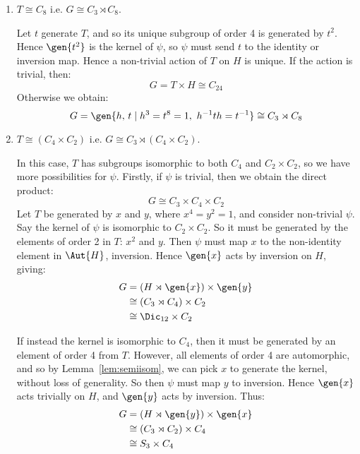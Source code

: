\begin{enumerate}
    \item \(T \cong C_8\) i.e. \(G \cong C_3 \rtimes C_8\).

        Let \(t\) generate \(T\), and so its unique subgroup of order 4 is generated by \(t^2\).
        Hence \(\gen{t^2}\) is the kernel of \(\psi\), so \(\psi\) must send \(t\) to the identity or
        inversion map.
        Hence a non-trivial action of \(T\) on \(H\) is unique.
        If the action is trivial, then:
        \[G = T \times H \cong C_{24}\]
        Otherwise we obtain:
        \[G = \gen{h,\,t \mid h^3 = t^8 = 1,\ h^{-1}th = t^{-1}} \cong C_3 \rtimes C_8\]

    \item \(T \cong (C_4 \times C_2)\) i.e. \(G \cong C_3 \rtimes (C_4 \times C_2)\).

        In this case, \(T\) has subgroups isomorphic to both \(C_4\) and \(C_2 \times C_2\), so we have more
        possibilities for \(\psi\).
        Firstly, if \(\psi\) is trivial, then we obtain the direct product:
        \[G \cong C_3 \times C_4 \times C_2\]
        Let \(T\) be generated by \(x\) and \(y\), where \(x^4 = y^2 = 1\), and consider non-trivial \(\psi\).
        Say the kernel of \(\psi\) is isomorphic to \(C_2 \times C_2\).
        So it must be generated by the elements of order 2 in \(T\): \(x^2\) and \(y\).
        Then \(\psi\) must map \(x\) to the non-identity element in \(\Aut{H}\), inversion.
        Hence \(\gen{x}\) acts by inversion on \(H\), giving:
        \begin{equation*}
        \begin{aligned}
            G &= (H \rtimes \gen{x}) \times \gen{y} \\
            &\cong (C_3 \rtimes C_4) \times C_2 \\
            &\cong \Dic_{12} \times C_2
        \end{aligned}
        \end{equation*}

        If instead the kernel is isomorphic to \(C_4\), then it must be generated by an element of order 4 from \(T\).
        However, all elements of order 4 are automorphic, and so by Lemma~\ref{lem:semiisom}, we can pick \(x\) to
        generate the kernel, without loss of generality.
        So then \(\psi\) must map \(y\) to inversion.
        Hence \(\gen{x}\) acts trivially on \(H\), and \(\gen{y}\) acts by inversion.
        Thus:
        \begin{equation*}
        \begin{aligned}
            G &= (H \rtimes \gen{y}) \times \gen{x} \\
            &\cong (C_3 \rtimes C_2) \times C_4 \\
            &\cong S_3 \times C_4
        \end{aligned}
        \end{equation*}


\end{enumerate}
